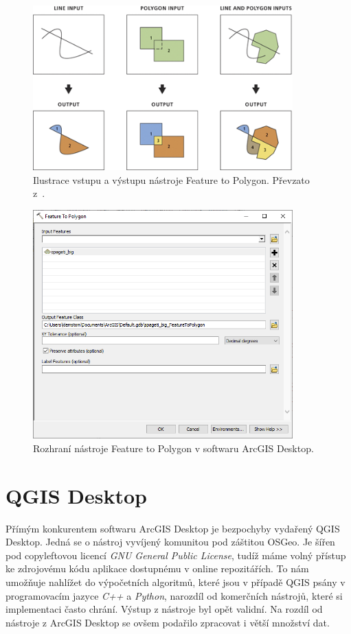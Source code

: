 \begin{figure}[h]
  \centering
  \includegraphics[width=10cm]{./pictures/5_1/feature_to_polygon.png}
  \caption{Ilustrace vstupu a výstupu nástroje Feature to Polygon. Převzato z~\cite{arcgis}.}
  \label{fig:feature_to_polygon}
\end{figure}

\begin{figure}[h]
  \centering
  \includegraphics[width=10cm]{./pictures/5_1/feature_to_polygon-1.png}
  \caption{Rozhraní nástroje Feature to Polygon v softwaru ArcGIS Desktop.}
  \label{fig:feature_to_polygon-1}
\end{figure}


\section{QGIS Desktop}
Přímým konkurentem softwaru ArcGIS Desktop je bezpochyby vydařený QGIS
Desktop. Jedná se o nástroj vyvíjený komunitou pod záštitou OSGeo. Je
šířen pod copyleftovou licencí \textit{GNU General Public License},
tudíž máme volný přístup ke zdrojovému kódu aplikace dostupnému v
online repozitářích. To nám umožňuje nahlížet do výpočetních
algoritmů, které jsou v případě QGIS psány v programovacím jazyce
\textit{C++} a \textit{Python}, narozdíl od komerčních nástrojů, které
si implementaci často chrání. Výstup z nástroje byl opět validní. Na
rozdíl od nástroje z ArcGIS Desktop se ovšem podařilo zpracovat i
větší množství dat.

